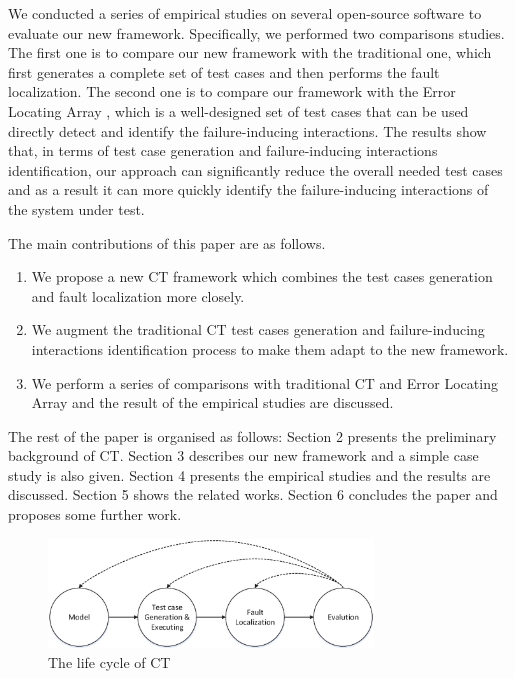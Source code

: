 \documentclass{sig-alternate}
\begin{document}
We conducted a series of empirical studies on several open-source software to evaluate our new framework. Specifically, we performed two comparisons studies. The first one is to compare our new framework with the traditional one, which first generates a complete set of test cases and then performs the fault localization. The second one is to compare our framework with the Error Locating Array \cite{martinez2008algorithms,martinez2009locating}, which is a well-designed set of test cases that can be used directly detect and identify the failure-inducing interactions. The results show that, in terms of test case generation and failure-inducing interactions identification, our approach can significantly reduce the overall needed test cases and as a result it can more quickly identify the failure-inducing interactions of the system under test.

The main contributions of this paper are as follows.

 \begin{enumerate}
 \item  We propose a new CT framework which combines the test cases generation and fault localization more closely.
 \item  We augment the traditional CT test cases generation and failure-inducing interactions identification process to make them adapt to the new framework.
 \item We perform a series of comparisons with traditional CT and Error Locating Array and the result of the empirical studies are discussed.
\end{enumerate}


The rest of the paper is organised as follows: Section 2 presents the preliminary background of CT.  Section 3 describes our new framework and a simple case study is also given. Section 4 presents the empirical studies and the results are discussed. Section 5 shows the related works. Section 6 concludes the paper and proposes some further work.


\begin{figure}
 \includegraphics[width=3.4in]{CT_lifecircle.eps}
\caption{The life cycle of CT}
\label{ct-life}
\end{figure}
\end{document}
